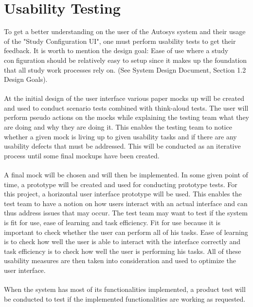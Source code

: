 \section{Usability Testing}
To get a better understanding on the user of the Autosys system and their usage of the "Study Configuration UI", one must perform usability tests to get their feedback. It is worth to mention the design goal: Ease of use where a study configuration should be relatively easy to setup since it makes up the foundation that all study work processes rely on. (See System Design Document, Section 1.2 Design Goals).\\\\
At the initial  design of the user interface various paper mocks up will be created and used to conduct scenario tests combined with think-aloud tests. The user will perform pseudo actions on the mocks while explaining the testing team what they are doing and why they are doing it. This enables the testing team to notice whether a given mock is living up to given usability tasks and if there are any usability defects that must be addressed. This will be conducted as an iterative process until some final mockups have been created.  \\\\A final mock will be chosen and will then be implemented. In some given point of time, a prototype will be created and used for conducting prototype tests.  For this project, a horizontal user interface prototype will be used. This enables the test team to have a notion on how users interact with an actual interface and can thus address issues that may occur.  The test team may want to test if the system is fit for use, ease of learning and task efficiency. Fit for use because it is important to check whether the user can perform all of his tasks. Ease of learning is to check how well the user is able to interact with the interface correctly and task efficiency is to check how well the user is performing his tasks. All of these usability measures are then taken into consideration and used to optimize the user interface. \\\\When the system has most of its functionalities  implemented, a product test will be conducted to test if the implemented functionalities are working as requested.







